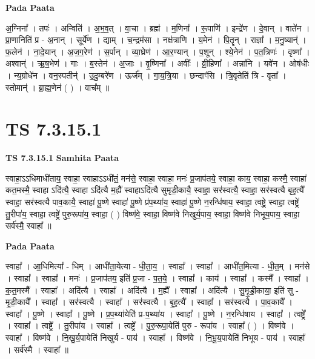 \documentclass[17pt]{extarticle}
\begin{document}
\textbf{Pada Paata} \newline

अ॒ग्निना᳚ । तपः॑ । अन्विति॑ । अ॒भ॒व॒त् । वा॒चा । ब्रह्म॑ । म॒णिना᳚ । रू॒पाणि॑ । इन्द्रे॑ण । दे॒वान् । वाते॑न । प्रा॒णानिति॑ प्र - अ॒नान् । सूर्ये॑ण । द्याम् । च॒न्द्रम॑सा । नक्ष॑त्राणि । य॒मेन॑ । पि॒तॄन् । राज्ञा᳚ । म॒नु॒ष्यान्॑ । फ॒लेन॑ । ना॒दे॒यान् । अ॒ज॒ग॒रेण॑ । स॒र्पान् । व्या॒घ्रेण॑ । आ॒र॒ण्यान् । प॒शून् । श्ये॒नेन॑ । प॒त॒त्रिणः॑ । वृष्णा᳚ । अश्वान्॑ । ऋ॒ष॒भेण॑ । गाः । ब॒स्तेन॑ । अ॒जाः । वृ॒ष्णिना᳚ । अवीः᳚ । व्री॒हिणा᳚ । अन्ना॑नि । यवे॑न । ओष॑धीः । न्य॒ग्रोधे॑न । वन॒स्पतीन्॑ । उ॒दु॒म्बरे॑ण । ऊर्ज᳚म् । गा॒य॒त्रि॒या । छन्दाꣳ॑सि । त्रि॒वृतेति॑ त्रि - वृता᳚ । स्तोमान्॑ । ब्रा॒ह्म॒णेन॑ ( ) । वाच᳚म् ॥  \newline




\section*{ TS 7.3.15.1 }

\textbf{TS 7.3.15.1 } \newline
\textbf{Samhita Paata} \newline

स्वाहा॒ऽऽधिमाधी॑ताय॒ स्वाहा॒ स्वाहाऽऽधी॑तं॒ मन॑से॒ स्वाहा॒ स्वाहा॒ मनः॑ प्र॒जाप॑तये॒ स्वाहा॒ काय॒ स्वाहा॒ कस्मै॒ स्वाहा॑ कत॒मस्मै॒ स्वाहा ऽदि॑त्यै॒ स्वाहा ऽदि॑त्यै म॒ह्यै᳚ स्वाहाऽदि॑त्यै सुमृडी॒कायै॒ स्वाहा॒ सर॑स्वत्यै॒ स्वाहा॒ सर॑स्वत्यै बृह॒त्यै᳚ स्वाहा॒ सर॑स्वत्यै पाव॒कायै॒ स्वाहा॑ पू॒ष्णे स्वाहा॑ पू॒ष्णे प्र॑प॒थ्या॑य॒ स्वाहा॑ पू॒ष्णे न॒रन्धि॑षाय॒ स्वाहा॒ त्वष्ट्रे॒ स्वाहा॒ त्वष्ट्रे॑ तु॒रीपा॑य॒ स्वाहा॒ त्वष्ट्रे॑ पुरु॒रूपा॑य॒ स्वाहा॒ ( ) विष्ण॑वे॒ स्वाहा॒ विष्ण॑वे निखुर्य॒पाय॒ स्वाहा॒ विष्ण॑वे निभूय॒पाय॒ स्वाहा॒ सर्व॑स्मै॒ स्वाहा᳚ ॥ \newline

\textbf{Pada Paata} \newline

स्वाहा᳚ । आ॒धिमित्या᳚ - धिम् । आधी॑ता॒येत्या - धी॒ता॒य॒ । स्वाहा᳚ । स्वाहा᳚ । आधी॑त॒मित्या - धी॒त॒म् । मन॑से । स्वाहा᳚ । स्वाहा᳚ । मनः॑ । प्र॒जाप॑तय॒ इति॑ प्र॒जा - प॒त॒ये॒ । स्वाहा᳚ । काय॑ । स्वाहा᳚ । कस्मै᳚ । स्वाहा᳚ । क॒त॒मस्मै᳚ । स्वाहा᳚ । अदि॑त्यै । स्वाहा᳚ । अदि॑त्यै । म॒ह्यै᳚ । स्वाहा᳚ । अदि॑त्यै । सु॒मृ॒डी॒काया॒ इति॑ सु - मृ॒डी॒कायै᳚ । स्वाहा᳚ । सर॑स्वत्यै । स्वाहा᳚ । सर॑स्वत्यै । बृ॒ह॒त्यै᳚ । स्वाहा᳚ । सर॑स्वत्यै । पा॒व॒कायै᳚ । स्वाहा᳚ । पू॒ष्णे । स्वाहा᳚ । पू॒ष्णे । प्र॒प॒थ्या॑येति॑ प्र-प॒थ्या॑य । स्वाहा᳚ । पू॒ष्णे । न॒रन्धि॑षाय । स्वाहा᳚ । त्वष्ट्रे᳚ । स्वाहा᳚ । त्वष्ट्रे᳚ । तु॒रीपा॑य । स्वाहा᳚ । त्वष्ट्रे᳚ । पु॒रु॒रूपा॒येति॑ पुरु - रूपा॑य । स्वाहा᳚ ( ) । विष्ण॑वे । स्वाहा᳚ । विष्ण॑वे । नि॒खु॒र्य॒पायेति॑ निखुर्य - पाय॑ । स्वाहा᳚ । विष्ण॑वे । नि॒भू॒य॒पायेति॑ निभूय - पाय॑ । स्वाहा᳚ । सर्व॑स्मै । स्वाहा᳚ ॥  \newline
\end{document}
